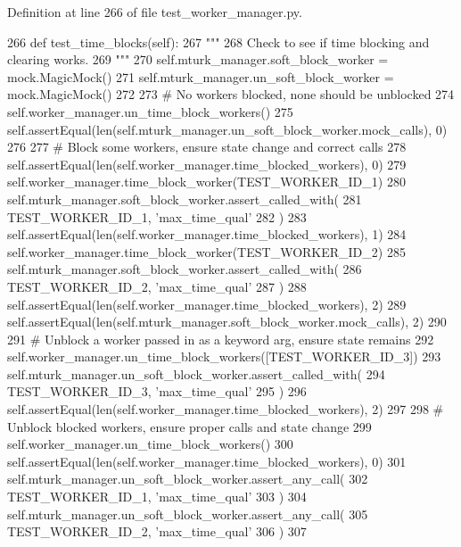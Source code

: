 Definition at line 266 of file test\+\_\+worker\+\_\+manager.\+py.


\begin{DoxyCode}
266     \textcolor{keyword}{def }test\_time\_blocks(self):
267         \textcolor{stringliteral}{"""}
268 \textcolor{stringliteral}{        Check to see if time blocking and clearing works.}
269 \textcolor{stringliteral}{        """}
270         self.mturk\_manager.soft\_block\_worker = mock.MagicMock()
271         self.mturk\_manager.un\_soft\_block\_worker = mock.MagicMock()
272 
273         \textcolor{comment}{# No workers blocked, none should be unblocked}
274         self.worker\_manager.un\_time\_block\_workers()
275         self.assertEqual(len(self.mturk\_manager.un\_soft\_block\_worker.mock\_calls), 0)
276 
277         \textcolor{comment}{# Block some workers, ensure state change and correct calls}
278         self.assertEqual(len(self.worker\_manager.time\_blocked\_workers), 0)
279         self.worker\_manager.time\_block\_worker(TEST\_WORKER\_ID\_1)
280         self.mturk\_manager.soft\_block\_worker.assert\_called\_with(
281             TEST\_WORKER\_ID\_1, \textcolor{stringliteral}{'max\_time\_qual'}
282         )
283         self.assertEqual(len(self.worker\_manager.time\_blocked\_workers), 1)
284         self.worker\_manager.time\_block\_worker(TEST\_WORKER\_ID\_2)
285         self.mturk\_manager.soft\_block\_worker.assert\_called\_with(
286             TEST\_WORKER\_ID\_2, \textcolor{stringliteral}{'max\_time\_qual'}
287         )
288         self.assertEqual(len(self.worker\_manager.time\_blocked\_workers), 2)
289         self.assertEqual(len(self.mturk\_manager.soft\_block\_worker.mock\_calls), 2)
290 
291         \textcolor{comment}{# Unblock a worker passed in as a keyword arg, ensure state remains}
292         self.worker\_manager.un\_time\_block\_workers([TEST\_WORKER\_ID\_3])
293         self.mturk\_manager.un\_soft\_block\_worker.assert\_called\_with(
294             TEST\_WORKER\_ID\_3, \textcolor{stringliteral}{'max\_time\_qual'}
295         )
296         self.assertEqual(len(self.worker\_manager.time\_blocked\_workers), 2)
297 
298         \textcolor{comment}{# Unblock blocked workers, ensure proper calls and state change}
299         self.worker\_manager.un\_time\_block\_workers()
300         self.assertEqual(len(self.worker\_manager.time\_blocked\_workers), 0)
301         self.mturk\_manager.un\_soft\_block\_worker.assert\_any\_call(
302             TEST\_WORKER\_ID\_1, \textcolor{stringliteral}{'max\_time\_qual'}
303         )
304         self.mturk\_manager.un\_soft\_block\_worker.assert\_any\_call(
305             TEST\_WORKER\_ID\_2, \textcolor{stringliteral}{'max\_time\_qual'}
306         )
307 
\end{DoxyCode}


